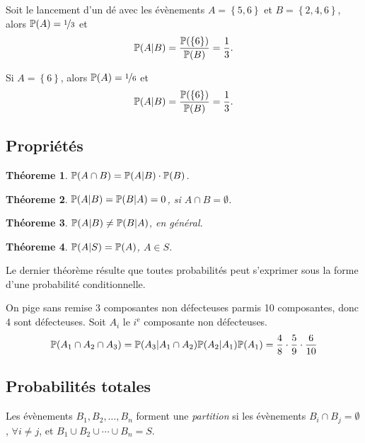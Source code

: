 \documentclass[11pt]{article}
\renewcommand\P{%
	\ensuremath{%
		\mathbb{P}%
	}%
}%
\newtheorem{theoreme}{Théoreme}[section]
\begin{document}
\begin{exemple}
	Soit le lancement d'un dé avec les évènements $A=\left\{5,6\right\}$ et
	$B=\left\{2,4,6\right\}$, alors $\P(A)=\nicefrac{1}{3}$ et 
	\begin{equation*}
		\P(A|B)=\frac{\P(\left\{6\right\})}{\P(B)}=\frac{1}{3}.
	\end{equation*}

	Si $A=\left\{6\right\}$, alors $\P(A)=\nicefrac{1}{6}$ et
	\begin{equation*}
		\P(A|B)=\frac{\P(\left\{6\right\})}{\P(B)}=\frac{1}{3}.
	\end{equation*}
\end{exemple}

\subsection{Propriétés}
\begin{theoreme}
	$\P(A\cap B)=\P(A|B)\cdot \P(B)$.
\end{theoreme}

\begin{theoreme}
	$\P(A|B)=\P(B|A)=0$, si $A\cap B=\emptyset$.
\end{theoreme}

\begin{theoreme}
	$\P(A|B)\neq \P(B|A)$, en général.
\end{theoreme}

\begin{theoreme}
	$\P(A|S)=\P(A)$, $A\in S$.
\end{theoreme}

Le dernier théorème résulte que toutes probabilités peut s'exprimer sous la
forme d'une probabilité conditionnelle.

\begin{exemple}
	On pige sans remise 3 composantes non défecteuses parmis 10 composantes, donc 4 sont
	défecteuses. Soit $A_i$ le $i^\text{e}$ composante non défecteuses.
	\begin{equation*}
		\P(A_1\cap A_2\cap A_3)=\P(A_3|A_1\cap A_2)\P(A_2|A_1)\P(A_1)
		=\frac{4}{8}\cdot\frac{5}{9}\cdot\frac{6}{10}
	\end{equation*}
\end{exemple}

\subsection{Probabilités totales}
\begin{definition}
	Les évènements $B_1,B_2,\dots,B_n$ forment une \textit{partition} si les
	évènements $B_i\cap B_j=\emptyset$, $\forall i\neq j$, et
	$B_1\cup B_2\cup\cdots\cup B_n=S$.
\end{definition}
\end{document}
